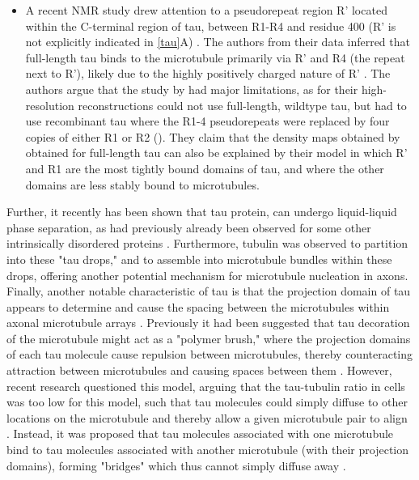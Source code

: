 \begin{itemize}
	\item A recent NMR study drew attention to a pseudorepeat region R' located within the C-terminal region of tau, between R1-R4 and residue 400 (R' is not explicitly indicated in \autoref{tau}A) . The authors from their data inferred that full-length tau binds to the microtubule primarily via R' and R4 (the repeat next to R'), likely due to the highly positively charged nature of R' .  The authors argue that the study by \cite{Kellogg2018} had major limitations, as \cite{Kellogg2018} for their high-resolution reconstructions could not use full-length, wildtype tau, but had to use recombinant tau where the R1-4 pseudorepeats were replaced by four copies of either R1 or R2 (\cite{Kellogg2018}). They claim that the density maps obtained by \cite{Kellogg2018} obtained for full-length tau can also be explained by their model in which R' and R1 are the most tightly bound domains of tau, and where the other domains are less stably bound to microtubules.
\end{itemize}

Further, it recently has been shown that tau protein, can undergo liquid-liquid phase separation, as had previously already been observed for some other intrinsically disordered proteins . Furthermore, tubulin was observed to partition into these "tau drops," and to assemble into microtubule bundles within these drops, offering another potential mechanism for microtubule nucleation in axons. Finally, another notable characteristic of tau is that the projection domain of tau appears to determine and cause the spacing between the microtubules within axonal microtubule arrays \parencite{Chen1992}. Previously it had been suggested that tau decoration of the microtubule might act as a "polymer brush," where the projection domains of each tau molecule cause repulsion between microtubules, thereby counteracting attraction between microtubules and causing spaces between them . However, recent research questioned this model, arguing that the tau-tubulin ratio in cells was too low for this model, such that tau molecules could simply diffuse to other locations on the microtubule and thereby allow a given microtubule pair to align . Instead, it was proposed that tau molecules associated with one microtubule bind to tau molecules associated with another microtubule (with their projection domains), forming "bridges" which thus cannot simply diffuse away .\par

